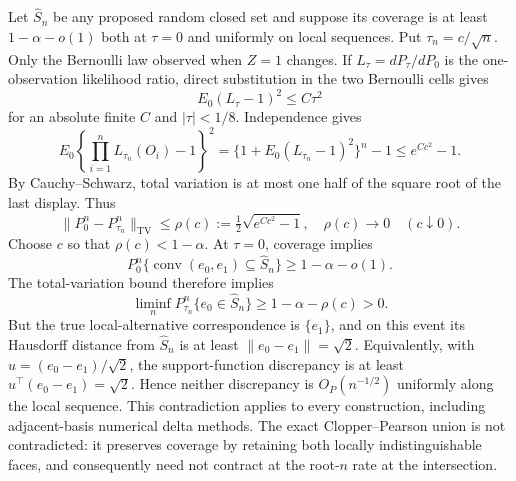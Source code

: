 Let \(\widehat S_n\) be any proposed random closed set and suppose its coverage is at least \(1-\alpha-o(1)\) both at \(\tau=0\) and uniformly on local sequences.  Put \(\tau_n=c/\sqrt n\).  Only the Bernoulli law observed when \(Z=1\) changes.  If \(L_\tau=dP_\tau/dP_0\) is the one-observation likelihood ratio, direct substitution in the two Bernoulli cells gives
\[
 E_0(L_\tau-1)^2\leq C\tau^2
\]
for an absolute finite \(C\) and \(|\tau|<1/8\).  Independence gives
\[
 E_0\left\{\prod_{i=1}^nL_{\tau_n}(O_i)-1\right\}^2
 =\{1+E_0(L_{\tau_n}-1)^2\}^n-1
 \leq e^{Cc^2}-1.
\]
By Cauchy--Schwarz, total variation is at most one half of the square root of the last display.  Thus
\[
 \|P_0^n-P_{\tau_n}^n\|_{\mathrm{TV}}\leq\rho(c):=\tfrac12\sqrt{e^{Cc^2}-1},
 \quad \rho(c)\longrightarrow0\quad(c\downarrow0).
\]
Choose \(c\) so that \(\rho(c)<1-\alpha\).  At \(\tau=0\), coverage implies
\[
 P_0^n\{\operatorname{conv}(e_0,e_1)\subseteq\widehat S_n\}\geq1-\alpha-o(1).
\]
The total-variation bound therefore implies
\[
 \liminf_nP_{\tau_n}^n\{e_0\in\widehat S_n\}
 \geq1-\alpha-\rho(c)>0.
\]
But the true local-alternative correspondence is \(\{e_1\}\), and on this event its Hausdorff distance from \(\widehat S_n\) is at least \(\|e_0-e_1\|=\sqrt2\).  Equivalently, with \(u=(e_0-e_1)/\sqrt2\), the support-function discrepancy is at least \(u^\top(e_0-e_1)=\sqrt2\).  Hence neither discrepancy is \(O_P(n^{-1/2})\) uniformly along the local sequence.  This contradiction applies to every construction, including adjacent-basis numerical delta methods.  The exact Clopper--Pearson union is not contradicted: it preserves coverage by retaining both locally indistinguishable faces, and consequently need not contract at the root-\(n\) rate at the intersection.

